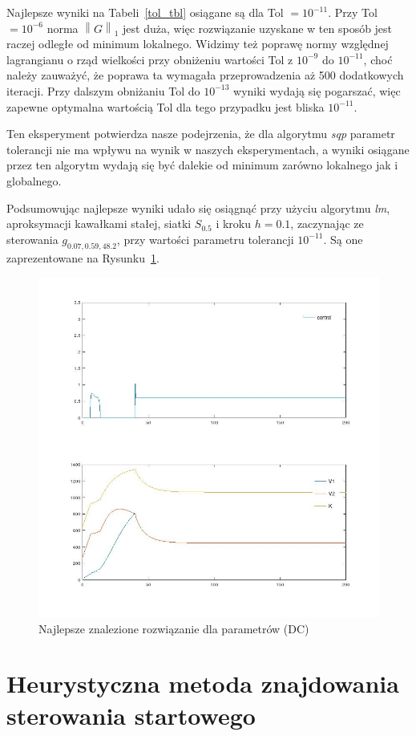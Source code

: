 \documentclass[licencjacka]{pracamgr}
\newcommand{\norm}[1]{\left\lVert#1\right\rVert}
\begin{document}
Najlepsze wyniki na Tabeli~\ref{tol_tbl} osiągane są dla Tol $= 10^{-11}$. Przy Tol $= 10^{-6}$ norma $\norm{G}_1$ jest duża, więc rozwiązanie uzyskane w ten sposób jest raczej odległe od minimum lokalnego. Widzimy też poprawę normy względnej lagrangianu o rząd wielkości przy obniżeniu wartości Tol z $10^{-9}$ do $10^{-11}$, choć należy zauważyć, że poprawa ta wymagała przeprowadzenia aż 500 dodatkowych iteracji. Przy dalszym obniżaniu Tol do $10^{-13}$ wyniki wydają się pogarszać, więc zapewne optymalna wartością Tol dla tego przypadku jest bliska $10^{-11}$.

Ten eksperyment potwierdza nasze podejrzenia, że dla algorytmu {\it sqp\/} parametr tolerancji nie ma wpływu na wynik w naszych eksperymentach, a wyniki osiągane przez ten algorytm wydają się być dalekie od minimum zarówno lokalnego jak i globalnego.

Podsumowując najlepsze wyniki udało się osiągnąć przy użyciu algorytmu {\it lm}, aproksymacji kawałkami stałej, siatki $S_{0.5}$ i kroku $h = 0.1$, zaczynając ze sterowania $g_{0.07,0.59,48.2}$, przy wartości parametru tolerancji $10^{-11}$. Są one zaprezentowane na Rysunku~\ref{plot_best_dc}.

\begin{figure}[h]
  \centering
  \includegraphics[width=.5\textwidth]{../plots/plot_best_dc}
  \caption{Najlepsze znalezione rozwiązanie dla parametrów (DC)}\label{plot_best_dc}
\end{figure}

\section{Heurystyczna metoda znajdowania sterowania startowego}\label{start_method}
\end{document}
